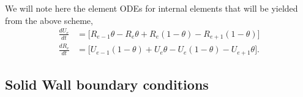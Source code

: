 \documentclass[a4paper,11pt]{article}
\begin{document}
We will note here the element ODEs for internal elements that will be yielded from the above scheme,
\begin{equation}
\begin{aligned}
\frac{d U_e}{d t} & =\bigg [    R_{e-1}\theta - R_{e}\theta + R_{e}(1-\theta) - R_{e+1}(1-\theta)                         \bigg]\\
\frac{d R_e}{d t} & =\bigg [    U_{e-1}(1-\theta)   + U_{e}\theta    - U_{e}(1-\theta)    - U_{e+1}\theta        \bigg].
\end{aligned}
\end{equation}

\subsection{ Solid Wall boundary conditions}
\end{document}

